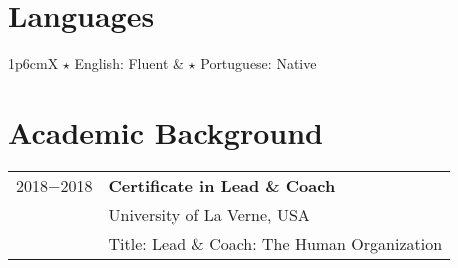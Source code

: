 \documentclass[a4paper, oneside, final]{scrartcl}
\newcommand{\vspc}{\vspace{0.15cm}} %
\begin{document}
\begin{center}
\begin{tabularx}{1\linewidth}{X}






\end{tabularx}


\section{Languages}
\begin{tabularx}{1\linewidth}{p{6cm}X}
$\star$ English: Fluent & $\star$ Portuguese: Native\\
\end{tabularx}

\section{Academic Background}
\begin{tabularx}{1\linewidth}{p{2cm}X}
2018$-$2018 & {\bf Certificate in Lead \& Coach}\\
            & University of La Verne, USA\\
            & Title: Lead \& Coach: The Human Organization\vspc\\
\end{tabularx}


\end{center}
\end{document}
